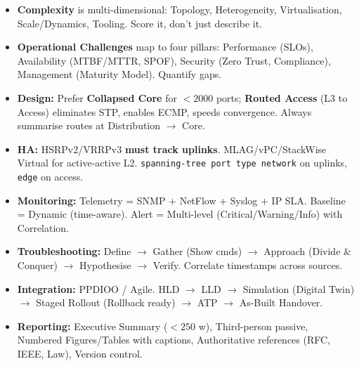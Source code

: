 \documentclass[11pt]{article}
\begin{document}
\begin{aretenir}
\begin{itemize}
\item \textbf{Complexity} is multi-dimensional: Topology, Heterogeneity, Virtualisation, Scale/Dynamics, Tooling. Score it, don't just describe it.
\item \textbf{Operational Challenges} map to four pillars: Performance (SLOs), Availability (MTBF/MTTR, SPOF), Security (Zero Trust, Compliance), Management (Maturity Model). Quantify gaps.
\item \textbf{Design:} Prefer \textbf{Collapsed Core} for $< 2000$ ports; \textbf{Routed Access} (L3 to Access) eliminates STP, enables ECMP, speeds convergence. Always summarise routes at Distribution $\rightarrow$ Core.
\item \textbf{HA:} HSRPv2/VRRPv3 \textbf{must track uplinks}. MLAG/vPC/StackWise Virtual for active-active L2. \texttt{spanning-tree port type network} on uplinks, \texttt{edge} on access.
\item \textbf{Monitoring:} Telemetry = SNMP + NetFlow + Syslog + IP SLA. Baseline = Dynamic (time-aware). Alert = Multi-level (Critical/Warning/Info) with Correlation.
\item \textbf{Troubleshooting:} Define $\rightarrow$ Gather (Show cmds) $\rightarrow$ Approach (Divide \& Conquer) $\rightarrow$ Hypothesise $\rightarrow$ Verify. Correlate timestamps across sources.
\item \textbf{Integration:} PPDIOO / Agile. HLD $\rightarrow$ LLD $\rightarrow$ Simulation (Digital Twin) $\rightarrow$ Staged Rollout (Rollback ready) $\rightarrow$ ATP $\rightarrow$ As-Built Handover.
\item \textbf{Reporting:} Executive Summary ($< 250$ w), Third-person passive, Numbered Figures/Tables with captions, Authoritative references (RFC, IEEE, Law), Version control.
\end{itemize}
\end{aretenir}
\end{document}
